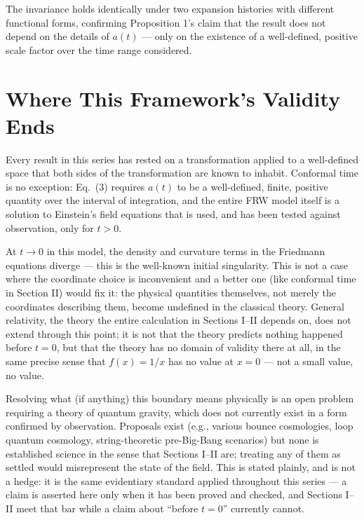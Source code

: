 \documentclass[10pt,journal,compsoc]{IEEEtran}
\begin{document}
The invariance holds identically under two expansion histories with different functional forms, confirming Proposition 1's claim that the result does not depend on the details of $a(t)$ — only on the existence of a well-defined, positive scale factor over the time range considered.

\section{Where This Framework's Validity Ends}
Every result in this series has rested on a transformation applied to a well-defined space that both sides of the transformation are known to inhabit. Conformal time is no exception: Eq.~(3) requires $a(t)$ to be a well-defined, finite, positive quantity over the interval of integration, and the entire FRW model itself is a solution to Einstein's field equations that is used, and has been tested against observation, only for $t>0$.

At $t\to 0$ in this model, the density and curvature terms in the Friedmann equations diverge — this is the well-known initial singularity. This is not a case where the coordinate choice is inconvenient and a better one (like conformal time in Section II) would fix it: the physical quantities themselves, not merely the coordinates describing them, become undefined in the classical theory. General relativity, the theory the entire calculation in Sections I--II depends on, does not extend through this point; it is not that the theory predicts nothing happened before $t=0$, but that the theory has no domain of validity there at all, in the same precise sense that $f(x)=1/x$ has no value at $x=0$ — not a small value, no value.

Resolving what (if anything) this boundary means physically is an open problem requiring a theory of quantum gravity, which does not currently exist in a form confirmed by observation. Proposals exist (e.g., various bounce cosmologies, loop quantum cosmology, string-theoretic pre-Big-Bang scenarios) but none is established science in the sense that Sections I--II are; treating any of them as settled would misrepresent the state of the field. This is stated plainly, and is not a hedge: it is the same evidentiary standard applied throughout this series — a claim is asserted here only when it has been proved and checked, and Sections I--II meet that bar while a claim about ``before $t=0$'' currently cannot.
\end{document}
